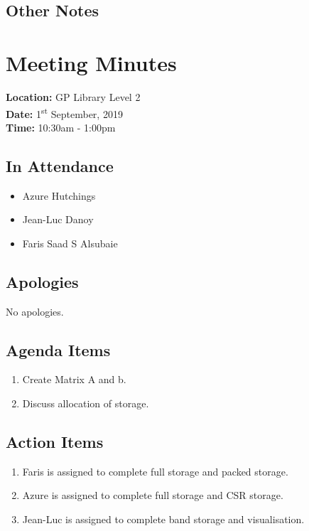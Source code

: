 \documentclass{article}
\begin{document}
\subsection*{Other Notes}

\pagebreak

\section{Meeting Minutes}
\textbf{Location:} GP Library Level 2 \\
\textbf{Date:} 1\textsuperscript{st} September, 2019 \\
\textbf{Time:} 10:30am - 1:00pm

\subsection*{In Attendance}
\begin{itemize}
\item Azure Hutchings
\item Jean-Luc Danoy
\item Faris Saad S Alsubaie
\end{itemize}

\subsection*{Apologies}
No apologies. 

\subsection*{Agenda Items}
\begin{enumerate}
\item Create Matrix A and b.
\item Discuss allocation of storage.
\end{enumerate}

\subsection*{Action Items}
\begin{enumerate}
\item Faris is assigned to complete full storage and packed storage.
\item Azure is assigned to complete full storage and CSR storage.
\item Jean-Luc is assigned to complete band storage and visualisation.
\end{enumerate}
\end{document}
